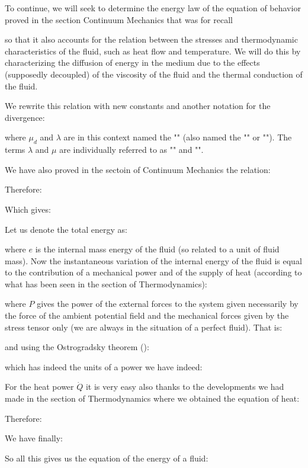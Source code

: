 	To continue, we will seek to determine the energy law of the equation of behavior proved in the section Continuum Mechanics that was for recall
	
	so that it also accounts for the relation between the stresses and thermodynamic characteristics of the fluid, such as heat flow and temperature. We will do this by characterizing the diffusion of energy in the medium due to the effects  (supposedly decoupled) of the viscosity of the fluid and the thermal conduction of the fluid.

	We rewrite this relation with new constants and another notation for the divergence:
	
	where $\mu_d$ and $\lambda$ are in this context named the "" (also named the "" or ""). The terms $\lambda$ and $\mu$ are individually referred to as "" and "".
	
	We have also proved in the sectoin of Continuum Mechanics the relation:
	
	Therefore:
	
	Which gives:
	
	Let us denote the total energy as:
	
	where $e$ is the internal mass energy of the fluid (so related to a unit of fluid mass). Now the instantaneous variation of the internal energy of the fluid is equal to the contribution of a mechanical power and of the supply of heat (according to what has been seen in the section of Thermodynamics):
	
	where $P$ gives the power of the external forces  to the system given necessarily by the force of the ambient potential field and the mechanical forces given by the stress tensor only (we are always in the situation of a perfect fluid). That is:
	
	and using the Ostrogradsky theorem ():
	
	which has indeed the units of a power we have indeed:	
	
	For the heat power $\dot{Q}$ it is very easy also thanks to the developments we had made in the section of Thermodynamics where we obtained the equation of heat:
	
	Therefore:
	
	We have finally:
	
	So all this gives us the equation of the energy of a fluid:
	
